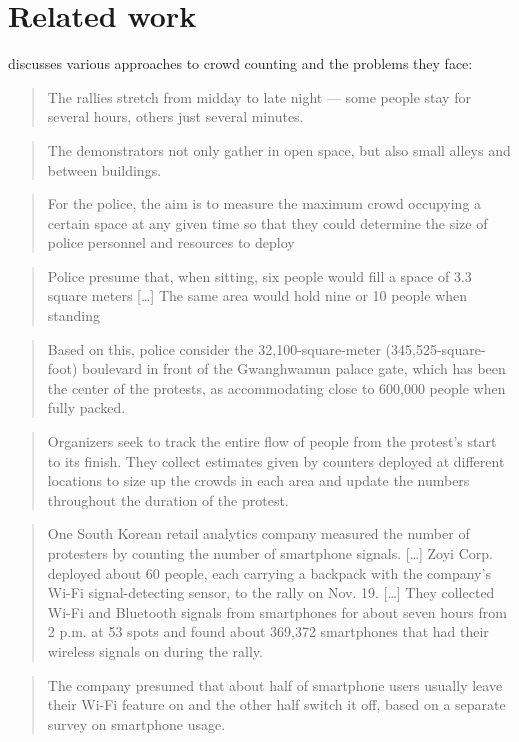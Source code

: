 \mode*
\section{Related work}

\Textcite{2016DemonstrationsInSeoul} discusses various approaches to crowd 
counting and the problems they face:

\blockcquote{2016DemonstrationsInSeoul}{%
  The rallies stretch from midday to late night --- some people stay for 
  several hours, others just several minutes.%
}

\blockcquote{2016DemonstrationsInSeoul}{%
  The demonstrators not only gather in open space, but also small alleys and 
  between buildings.%
}

\blockcquote{2016DemonstrationsInSeoul}{%
  For the police, the aim is to measure the maximum crowd occupying a certain 
  space at any given time so that they could determine the size of police 
  personnel and resources to deploy%
}

\blockcquote{2016DemonstrationsInSeoul}{%
  Police presume that, when sitting, six people would fill a space of 3.3 
  square meters
  [\dots]
  The same area would hold nine or 10 people when standing%
}

\blockcquote{2016DemonstrationsInSeoul}{%
  Based on this, police consider the 32,100-square-meter (345,525-square-foot) 
  boulevard in front of the Gwanghwamun palace gate, which has been the center 
  of the protests, as accommodating close to 600,000 people when fully packed.%
}

\blockcquote{2016DemonstrationsInSeoul}{%
  Organizers seek to track the entire flow of people from the protest’s start 
  to its finish. They collect estimates given by counters deployed at different 
  locations to size up the crowds in each area and update the numbers 
  throughout the duration of the protest.%
}

\blockcquote{2016DemonstrationsInSeoul}{%
  One South Korean retail analytics company measured the number of protesters 
  by counting the number of smartphone signals.
  [\dots]
  Zoyi Corp. deployed about 60 people, each carrying a backpack with the 
  company’s Wi-Fi signal-detecting sensor, to the rally on Nov. 19.
  [\dots]
  They collected Wi-Fi and Bluetooth signals from smartphones for about seven 
  hours from 2 p.m. at 53 spots and found about 369,372 smartphones that had 
  their wireless signals on during the rally.%
}

\blockcquote{2016DemonstrationsInSeoul}{%
  The company presumed that about half of smartphone users usually leave their 
  Wi-Fi feature on and the other half switch it off, based on a separate survey 
  on smartphone usage.%
}

